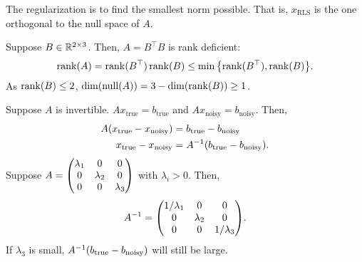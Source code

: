 \begin{rmk}
	The regularization is to find the smallest norm possible. That is, $x_\text{RLS}$ is the one orthogonal to the null space of $A$. 	
\end{rmk}
\begin{eg}{}
	Suppose $B\in{\mathbb{R}}^{2\times3}$. Then, $A=B^\top B$ is rank deficient: \[\rank(A)=\rank(B^\top)\rank(B)\leq\min\qty{\rank(B^\top), \rank(B)}.\] As $\rank(B)\leq2$, $\dim(\operatorname{null}(A))=3-\dim(\rank(B))\geq1$.
\end{eg}
\begin{eg}{}
	Suppose $A$	is invertible. $Ax_\text{true}=b_\text{true}$ and $Ax_\text{noisy}=b_\text{noisy}$. Then, \begin{align*}A\qty(x_\text{true}-x_\text{noisy})&=b_\text{true}-b_\text{noisy}\\x_\text{true}-x_\text{noisy}&=A^{-1}\qty(b_\text{true}-b_\text{noisy}).\end{align*} Suppose $A=\mqty(\lambda_1&0&0\\0&\lambda_2&0\\0&0&\lambda_3)$ with $\lambda_i>0$. Then, \[A^{-1}=\mqty(1/\lambda_1&0&0\\0&\lambda_2&0\\0&0&1/\lambda_3).\] If $\lambda_3$ is small, $A^{-1}\qty(b_\text{true}-b_\text{noisy})$ will still be large. 
\end{eg}

